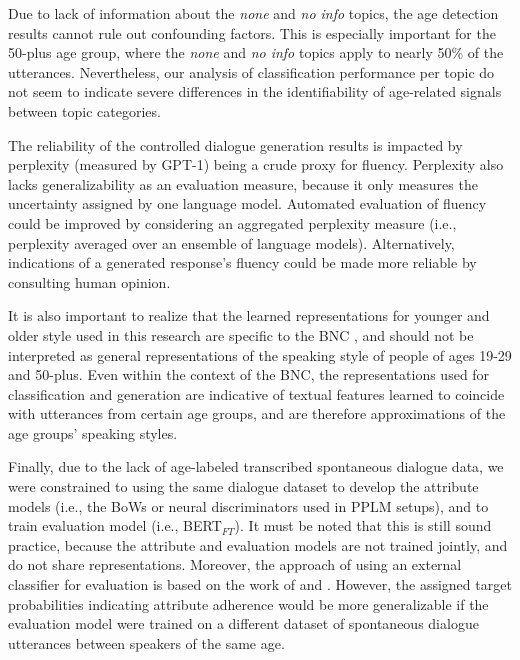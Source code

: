 Due to lack of information about the \textit{none} and \textit{no info} topics, the age detection results cannot rule out confounding factors. This is especially important for the 50-plus age group, where the \textit{none} and \textit{no info} topics apply to nearly 50\% of the utterances. Nevertheless, our analysis of classification performance per topic do not seem to indicate severe differences in the identifiability of age-related signals between topic categories. 

The reliability of the controlled dialogue generation results is impacted by perplexity (measured by GPT-1) being a crude proxy for fluency. Perplexity also lacks generalizability as an evaluation measure, because it only measures the uncertainty assigned by one language model. Automated evaluation of fluency could be improved by considering an aggregated perplexity measure (i.e., perplexity averaged over an ensemble of language models). Alternatively, indications of a generated response's fluency could be made more reliable by consulting human opinion. 

It is also important to realize that the learned representations for younger and older style used in this research are specific to the BNC \citep{love-spoken-bnc-2014}, and should not be interpreted as general representations of the speaking style of people of ages 19-29 and 50-plus. Even within the context of the BNC, the representations used for classification and generation are indicative of textual features learned to coincide with utterances from certain age groups, and are therefore approximations of the age groups' speaking styles. 

Finally, due to the lack of age-labeled transcribed spontaneous dialogue data, we were constrained to using the same dialogue dataset to develop the attribute models (i.e., the BoWs or neural discriminators used in PPLM setups), and to train evaluation model (i.e., BERT$_{FT}$). It must be noted that this is still sound practice, because the attribute and evaluation models are not trained jointly, and do not share representations. Moreover, the approach of using an external classifier for evaluation is based on the work of \cite{dathathri2019plug} and \cite{madotto-etal-2020-plug}. However, the assigned target probabilities indicating attribute adherence would be more generalizable if the evaluation model were trained on a different dataset of spontaneous dialogue utterances between speakers of the same age.



